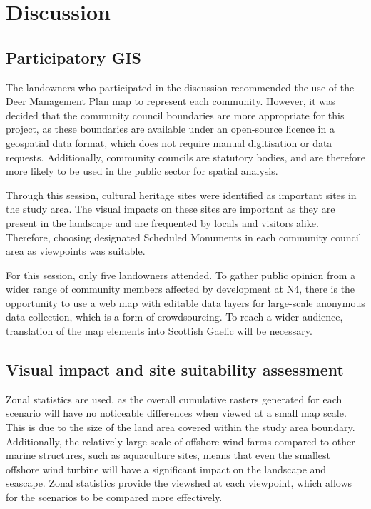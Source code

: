 \chapter{Discussion}

\section{Participatory GIS}

The landowners who participated in the discussion recommended the use of the Deer Management Plan map to represent each community. However, it was decided that the community council boundaries are more appropriate for this project, as these boundaries are available under an open-source licence in a geospatial data format, which does not require manual digitisation or data requests. Additionally, community councils are statutory bodies, and are therefore more likely to be used in the public sector for spatial analysis.

Through this session, cultural heritage sites were identified as important sites in the study area. The visual impacts on these sites are important as they are present in the landscape and are frequented by locals and visitors alike. Therefore, choosing designated Scheduled Monuments in each community council area as viewpoints was suitable.

For this session, only five landowners attended. To gather public opinion from a wider range of community members affected by development at N4, there is the opportunity to use a web map with editable data layers for large-scale anonymous data collection, which is a form of crowdsourcing. To reach a wider audience, translation of the map elements into Scottish Gaelic will be necessary.

\section{Visual impact and site suitability assessment}

Zonal statistics are used, as the overall cumulative rasters generated for each scenario will have no noticeable differences when viewed at a small map scale. This is due to the size of the land area covered within the study area boundary. Additionally, the relatively large-scale of offshore wind farms compared to other marine structures, such as aquaculture sites, means that even the smallest offshore wind turbine will have a significant impact on the landscape and seascape. Zonal statistics provide the viewshed at each viewpoint, which allows for the scenarios to be compared more effectively.

